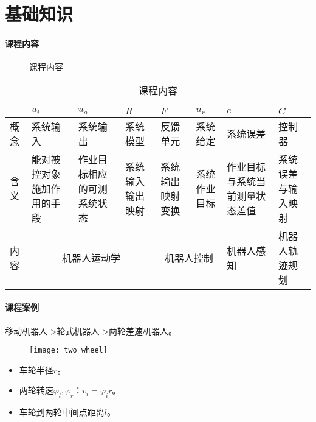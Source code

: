 \documentclass[
12pt, %
a4paper, 
oneside, %
headinclude,footinclude, %
]{scrartcl}
\title{\normalfont\spacedallcaps{智能工程}}
\date{}
\begin{document}
\maketitle
\newpage
\hypertarget{toc}{}
\begingroup
\begin{multicols}{2}
\tableofcontents
\end{multicols}
\endgroup
\newpage
\listoffigures
\listoftables
\listoftips
\newpage
\section{基础知识}
\paragraph{课程内容}
\begin{figure}[H]
\centering
{} \quad
{}
\caption[课程内容]{课程内容}
\end{figure}

\begin{table}[hbt]
\caption{课程内容}
\centering
\begin{tabular}{|p{0.5cm}|p{2cm}|p{2cm}|p{2cm}|p{2cm}|p{2cm}|p{2cm}|p{2cm}|}
\hline
& $ u_i $ & $ u_o $ & $ R $ & $ F $ & $ u_r $ & $ e $ & $ C $ \\
\hline
概念 & 系统输入 & 系统输出 & 系统模型 & 反馈单元 & 系统给定 & 系统误差 & 控制器 \\
\hline
含义 & 能对被控对象施加作用的手段 & 作业目标相应的可测系统状态 & 系统输入输出映射 & 系统输出映射变换 & 系统作业目标 & 作业目标与系统当前测量状态差值 & 系统误差与输入映射 \\
\hline
内容 & \multicolumn{3}{c|}{机器人运动学} & \multicolumn{2}{c|}{机器人控制} & 机器人感知 & 机器人轨迹规划 \\
\hline
\end{tabular}
\end{table}
\paragraph{课程案例}\label{sec:two_wheel}
移动机器人->轮式机器人->两轮差速机器人。

\begin{minipage}{0.45\textwidth}
\begin{figure}[H]
\centering
\texttt{[image: two\_wheel]} 
\end{figure}
\end{minipage}
\hfill
\begin{minipage}{0.45\textwidth}
\begin{itemize}
\item 车轮半径$ r $。
\item 两轮转速$ \varphi_l,\varphi_r $：$ v_i = \varphi_i r $。
\item 车轮到两轮中间点距离$ l $。
\end{itemize}
\end{minipage}
\end{document}
